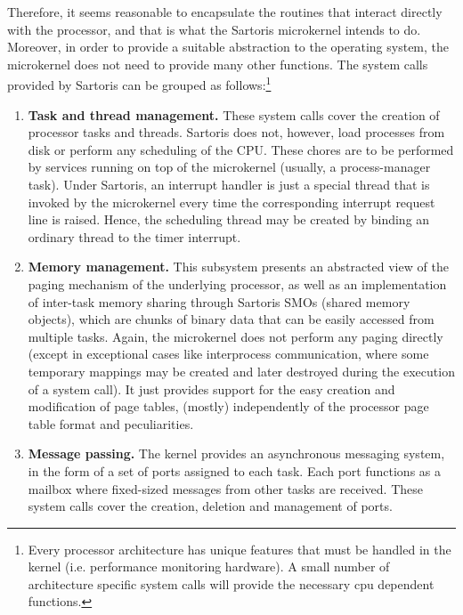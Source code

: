 \documentclass[11pt, letterpaper, twoside, english]{book}
\begin{document}
Therefore, it seems reasonable to encapsulate the routines that interact directly with the processor, and that is what the Sartoris microkernel intends to do. Moreover, in order to provide a suitable abstraction to the operating system, the microkernel does not need to provide many other functions. The system calls provided by Sartoris can be grouped as follows:\footnote{Every processor architecture has unique features that must be handled in the kernel (i.e. performance monitoring hardware). A small number of architecture specific system calls will provide the necessary cpu dependent functions. }

\begin{enumerate}
\item[]\textbf{Task and thread management.} These system calls cover the creation of processor tasks and threads. Sartoris does not, however, load processes from disk or perform any scheduling of the CPU. These chores are to be performed by services running on top of the microkernel (usually, a process-manager task). Under Sartoris, an interrupt handler is just a special thread that is invoked by the microkernel every time the corresponding interrupt request line is raised. Hence, the scheduling thread may be created by binding an ordinary thread to the timer interrupt.
\item[]\textbf{Memory management.} This subsystem presents an abstracted view of the paging mechanism of the underlying processor, as well as an implementation of inter-task memory sharing through Sartoris SMOs (shared memory objects), which are chunks of binary data that can be easily accessed from multiple tasks. Again, the microkernel does not perform any paging directly (except in exceptional cases like interprocess communication, where some temporary mappings may be created and later destroyed during the execution of a system call). It just provides support for the easy creation and modification of page tables, (mostly) independently of the processor page table format and peculiarities.
\item[]\textbf{Message passing.} The kernel provides an asynchronous messaging system, in the form of a set of ports assigned to each task. Each port functions as a mailbox where fixed-sized messages from other tasks are received. These system calls cover the creation, deletion and management of ports.
\end{enumerate}
\end{document}
